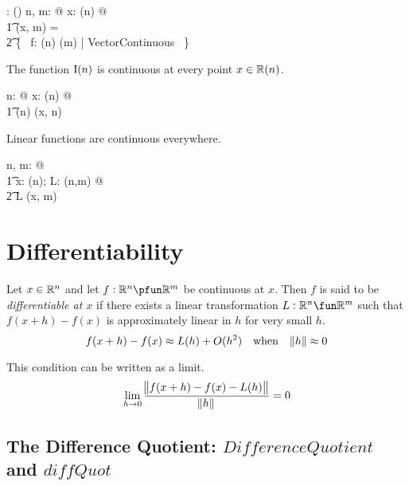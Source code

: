 \documentclass[11pt, oneside]{article}
\begin{document}
\begin{axdef}
	\CzeroPointRtupRtup: \Rinf \cross \nat \fun \power (\Rinf \pfun \Rinf)
\where
	\forall n, m: \nat @ \forall x: \Rtup(n)  @ \\
	\t1	\CzeroPointRtupRtup(x, m) = \\
	\t2		\{~ f: \Rtup(n) \pfun \Rtup(m) | VectorContinuous ~\}
\end{axdef}

\begin{example}
The function $\operatorname{I}(n)$ is continuous at every point $x \in \operatorname{\mathbb{R}}(n)$.

\begin{zed}
	\forall n: \nat @ \forall x: \Rtup(n) @ \\
	\t1	\idRtup(n) \in \CzeroPointRtupRtup(x, n)
\end{zed}

\end{example}

\begin{theorem}
Linear functions are continuous everywhere.

\begin{zed}
	\forall n, m: \nat @ \\
	\t1	\forall x: \Rtup(n); L: \linRtup(n,m) @ \\
	\t2		L \in \CzeroPointRtupRtup(x, m)
\end{zed}

\end{theorem}


\section{Differentiability}

Let $x \in \mathbb{R}^n$ and let $f: \R^n \pfun \R^m$ be continuous at $x$.
Then $f$ is said to be {\it differentiable at $x$} if there exists a linear transformation $L: \R^n \fun \R^m$
such that $f(x + h) - f(x)$ is approximately linear in $h$ for very small $h$.
$$
f(x + h) - f(x) \approx  L(h) + O(h^2) \quad \text{when} \quad \norm{h} \approx 0
$$

This condition can be written as a limit.
$$
\lim_{h \to 0} \frac{\norm{f(x+h) - f(x) - L(h)}}{\norm{h}} = 0
$$

\subsection{The Difference Quotient: $DifferenceQuotient$ and $diffQuot$}
\end{document}
